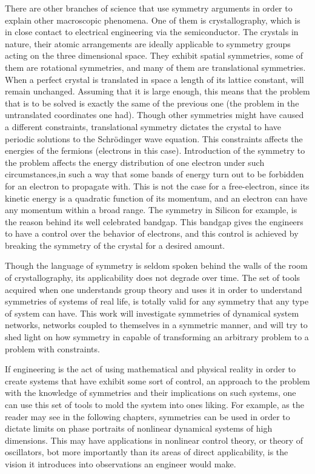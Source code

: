 There are other branches of science that use symmetry arguments in order to explain other macroscopic phenomena. One of them is crystallography, which is in close contact to electrical engineering via the semiconductor. The crystals in nature, their atomic arrangements are ideally applicable to symmetry groups acting on the three dimensional space. They exhibit spatial symmetries, some of them are rotational symmetries, and many of them are translational symmetries. When a perfect crystal is translated in space a length of its lattice constant, will remain unchanged. Assuming that it is large enough, this means that the problem that is to be solved is exactly the same of the previous one (the problem in the untranslated coordinates one had). Though other symmetries might have caused a different constraints, translational symmetry dictates the crystal to have periodic solutions to the Schr\"{o}dinger wave equation. This constraints affects the energies of the fermions (electrons in this case). Introduction of the symmetry to the problem affects the energy distribution of one electron under such circumstances,in such a way that some bands of energy turn out to be forbidden for an electron to propagate with. This is not the case for a free-electron, since its kinetic energy is a quadratic function of its momentum, and an electron can have any momentum within a broad range. The symmetry in Silicon for example, is the reason behind its well celebrated bandgap. This bandgap gives the engineers to have a control over the behavior of electrons, and this control is achieved by breaking the symmetry of the crystal for a desired amount. \cite{ashcroft_solid_1976,colclaser_materials_1986}

Though the language of symmetry is seldom spoken behind the walls of the room of crystallography, its applicability does not degrade over time. The set of tools acquired when one understands group theory and uses it in order to understand symmetries of systems of real life, is totally valid for any symmetry that any type of system can have. This work will investigate symmetries of dynamical system networks, networks coupled to themselves in a symmetric manner, and will try to shed light on how symmetry in capable of transforming an arbitrary problem to a problem with constraints.

If engineering is the act of using mathematical and physical reality in order to create systems that have exhibit some sort of control, an approach to the problem with the knowledge of symmetries and their implications on such systems, one can use this set of tools to mold the system into ones liking.  For example, as the reader may see in the following chapters, symmetries can be used in order to dictate limits on phase portraits of nonlinear dynamical systems of high dimensions. This may have applications in nonlinear control theory, or theory of oscillators, bot more importantly than its areas of direct applicability, is the vision it introduces into observations an engineer would make.

